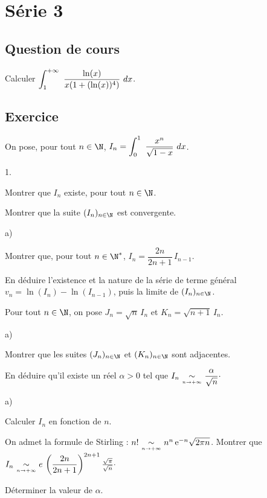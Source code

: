 \documentclass[11pt]{article}%
\begin{document}
\newpage

\section*{Série 3}
\subsection*{Question de cours}
Calculer $\displaystyle \int_{1}^{+\infty}\  \dfrac{\ln(x)}{x(1+(\ln(x))^4)} \ dx$.

\subsection*{Exercice}
\noindent
On pose, pour tout $n\in\N$, 
$I_n=\displaystyle \int_{0}^{1}\ \dfrac{x^n}{\sqrt{1-x}}\ dx$.\\
\begin{noliste}{1.}
\item Montrer que $I_n$ existe, pour tout $n\in\N$.
\item Montrer que la suite $(I_n)_{n\in\N}$ est convergente.
\item \begin{noliste}{a)}
	\item Montrer que, pour tout $n\in\N^*$, 
$I_n=\dfrac{2n}{2n+1}\,I_{n-1}$.
	\item En déduire l'existence et la nature de la série de terme 
général $v_n=\ln(I_n)-\ln(I_{n-1})$, puis la limite de $(I_n)_{n\in\N}$.
	\end{noliste}
\item Pour tout $n\in\N$, on pose $J_n=\sqrt{n}\,I_n$ et 
$K_n=\sqrt{n+1}\,I_n$.
	\begin{noliste}{a)}
	\item Montrer que les suites $(J_n)_{n\in\N}$ et 
$(K_n)_{n\in\N}$ sont adjacentes.
	\item En déduire qu'il existe un réel $\alpha>0$ tel que 
$I_n{\ \underset {{\overset {n \to +\infty}{}}}{\sim}\ } \dfrac{\alpha}{\sqrt{n}}\cdot$
	\end{noliste}
\item \begin{noliste}{a)}
	\item Calculer $I_n$ en fonction de $n$.
	\item On admet la formule de Stirling : $n!
{\ \underset {{\overset {n \to +\infty}{}}}{\sim}\ } n^n\,\text{e}^{-n}\sqrt{2\pi n}$. Montrer que 
$I_n{\ \underset {{\overset {n \to +\infty}{}}}{\sim}\ } e\,\left(\dfrac{2n}{2n+1}
\right)^{2n+1}\frac{\sqrt{\pi}}{\sqrt{n}}\cdot$
	\item Déterminer la valeur de $\alpha$.
\end{noliste}
\end{noliste}
\end{document}
